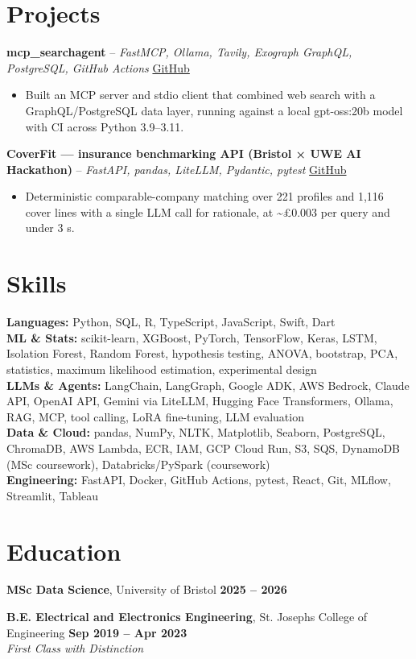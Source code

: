 \documentclass[a4paper,10pt]{article}
\begin{document}
\section{Projects}
\noindent\textbf{mcp\_searchagent} -- \textit{FastMCP, Ollama, Tavily, Exograph GraphQL, PostgreSQL, GitHub Actions} \hfill \href{https://github.com/Thiruvel-AP/mcp_searchagent}{GitHub}
\begin{itemize}
  \item Built an MCP server and stdio client that combined web search with a GraphQL/PostgreSQL data layer, running against a local gpt-oss:20b model with CI across Python 3.9–3.11.
\end{itemize}
\noindent\textbf{CoverFit — insurance benchmarking API (Bristol × UWE AI Hackathon)} -- \textit{FastAPI, pandas, LiteLLM, Pydantic, pytest} \hfill \href{https://github.com/Thiruvel-AP/AIHackathon-Phoenix}{GitHub}
\begin{itemize}
  \item Deterministic comparable-company matching over 221 profiles and 1,116 cover lines with a single LLM call for rationale, at \textasciitilde{}£0.003 per query and under 3 s.
\end{itemize}

\section{Skills}
\textbf{Languages:} Python, SQL, R, TypeScript, JavaScript, Swift, Dart\\
\textbf{ML \& Stats:} scikit-learn, XGBoost, PyTorch, TensorFlow, Keras, LSTM, Isolation Forest, Random Forest, hypothesis testing, ANOVA, bootstrap, PCA, statistics, maximum likelihood estimation, experimental design\\
\textbf{LLMs \& Agents:} LangChain, LangGraph, Google ADK, AWS Bedrock, Claude API, OpenAI API, Gemini via LiteLLM, Hugging Face Transformers, Ollama, RAG, MCP, tool calling, LoRA fine-tuning, LLM evaluation\\
\textbf{Data \& Cloud:} pandas, NumPy, NLTK, Matplotlib, Seaborn, PostgreSQL, ChromaDB, AWS Lambda, ECR, IAM, GCP Cloud Run, S3, SQS, DynamoDB (MSc coursework), Databricks/PySpark (coursework)\\
\textbf{Engineering:} FastAPI, Docker, GitHub Actions, pytest, React, Git, MLflow, Streamlit, Tableau

\section{Education}
\textbf{MSc Data Science}, University of Bristol \hfill \textbf{2025 – 2026}\par
\vspace{2pt}
\textbf{B.E. Electrical and Electronics Engineering}, St. Joseph\textquotesingle{}s College of Engineering \hfill \textbf{Sep 2019 – Apr 2023}\\ \textit{First Class with Distinction}\par
\end{document}
